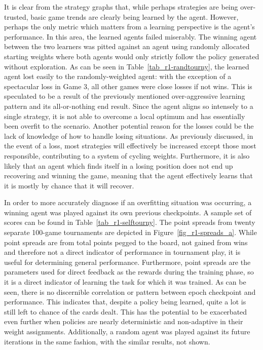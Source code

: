 It is clear from the strategy graphs that,
while perhaps strategies are being over-trusted,
basic game trends are clearly being learned by the agent.
%
However, perhaps the only metric which matters from a learning perspective is
the agent's performance.
%
In this area, the learned agents failed miserably.
%
The winning agent between the two learners was pitted against
an agent using randomly allocated starting weights
where both agents would only strictly follow the policy generated
without exploration.
%
As can be seen in Table~\ref{tab_r1-randtourny},
the learned agent lost easily to the randomly-weighted agent:
with the exception of a spectacular loss in Game 3,
all other games were close losses if not wins.
%
This is speculated to be a result of the previously mentioned over-aggressive
learning pattern and its all-or-nothing end result.
%
Since the agent aligns so intensely to a single strategy,
it is not able to overcome a local optimum
and has essentially been overfit to the scenario.
%
Another potential reason for the losses could be the lack of knowledge of how to
handle losing situations.
%
As previously discussed,
in the event of a loss,
most strategies will effectively be increased except those most responsible,
contributing to a system of cycling weights.
%
Furthermore, it is also likely that an agent which finds itself in a losing
position does not end up recovering and winning the game,
meaning that
the agent effectively learns that it is mostly by chance that it will recover.




In order to more accurately diagnose if an overfitting situation was occurring,
a winning agent was played against its own previous checkpoints.
%
A sample set of scores can be found in Table~\ref{tab_r1-selftourny}.
%
The point spreads from twenty separate 100-game tournaments
are depicted in Figure~\ref{fig_r1-spreads_a}.
%
While point spreads are from total points pegged to the board,
not gained from wins
and therefore not a direct indicator of performance in tournament play,
it is useful for determining general performance.
%
Furthermore,
point spreads are the parameters used for direct feedback as the rewards
during the training phase,
so it is a direct indicator of learning the task for which it was trained.
%
As can be seen, there is no discernible correlation or pattern between
epoch checkpoint and performance.
%
This indicates that,
despite a policy being learned,
quite a lot is still left to chance of the cards dealt.
%
This has the potential to be exacerbated even further when policies are nearly
deterministic and non-adaptive in their weight assignments.
%
Additionally,
a random agent was played against its future iterations in the same fashion,
with the similar results, not shown. %



